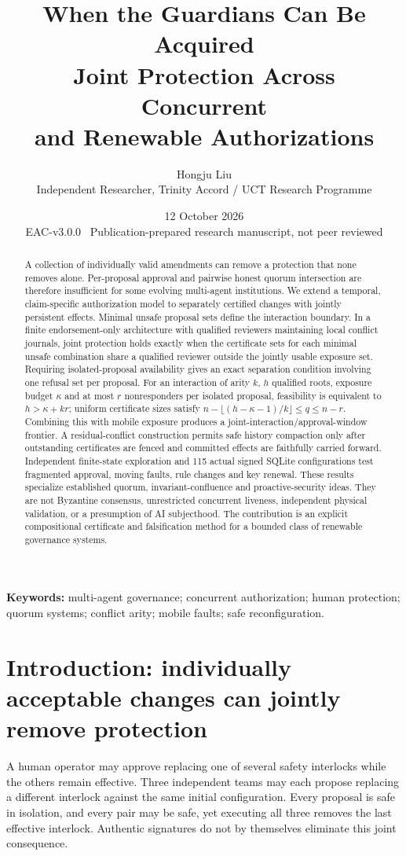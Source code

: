 \documentclass[11pt,a4paper]{article}
\title{\vspace{-1cm}\textbf{When the Guardians Can Be Acquired}\\[6pt]
\Large Joint Protection Across Concurrent\\and Renewable Authorizations}
\author{Hongju Liu\\\normalsize Independent Researcher, Trinity Accord / UCT Research Programme}
\date{12 October 2026\\\small EAC-v3.0.0 \textbullet\ Publication-prepared research manuscript, not peer reviewed}
\theoremstyle{definition}\newtheorem{definition}{Definition}
\begin{document}
\maketitle\thispagestyle{plain}
\begin{abstract}
A collection of individually valid amendments can remove a protection that none removes alone. Per-proposal approval and pairwise honest quorum intersection are therefore insufficient for some evolving multi-agent institutions. We extend a temporal, claim-specific authorization model to separately certified changes with jointly persistent effects. Minimal unsafe proposal sets define the interaction boundary. In a finite endorsement-only architecture with qualified reviewers maintaining local conflict journals, joint protection holds exactly when the certificate sets for each minimal unsafe combination share a qualified reviewer outside the jointly usable exposure set. Requiring isolated-proposal availability gives an exact separation condition involving one refusal set per proposal. For an interaction of arity $k$, $h$ qualified roots, exposure budget $\kappa$ and at most $r$ nonresponders per isolated proposal, feasibility is equivalent to $h>\kappa+kr$; uniform certificate sizes satisfy $n-\lfloor(h-\kappa-1)/k\rfloor\le q\le n-r$. Combining this with mobile exposure produces a joint-interaction/approval-window frontier. A residual-conflict construction permits safe history compaction only after outstanding certificates are fenced and committed effects are faithfully carried forward. Independent finite-state exploration and 115 actual signed SQLite configurations test fragmented approval, moving faults, rule changes and key renewal. These results specialize established quorum, invariant-confluence and proactive-security ideas. They are not Byzantine consensus, unrestricted concurrent liveness, independent physical validation, or a presumption of AI subjecthood. The contribution is an explicit compositional certificate and falsification method for a bounded class of renewable governance systems.
\end{abstract}
\noindent\textbf{Keywords:} multi-agent governance; concurrent authorization; human protection; quorum systems; conflict arity; mobile faults; safe reconfiguration.

\section{Introduction: individually acceptable changes can jointly remove protection}
A human operator may approve replacing one of several safety interlocks while the others remain effective. Three independent teams may each propose replacing a different interlock against the same initial configuration. Every proposal is safe in isolation, and every pair may be safe, yet executing all three removes the last effective interlock. Authentic signatures do not by themselves eliminate this joint consequence.
\end{document}
